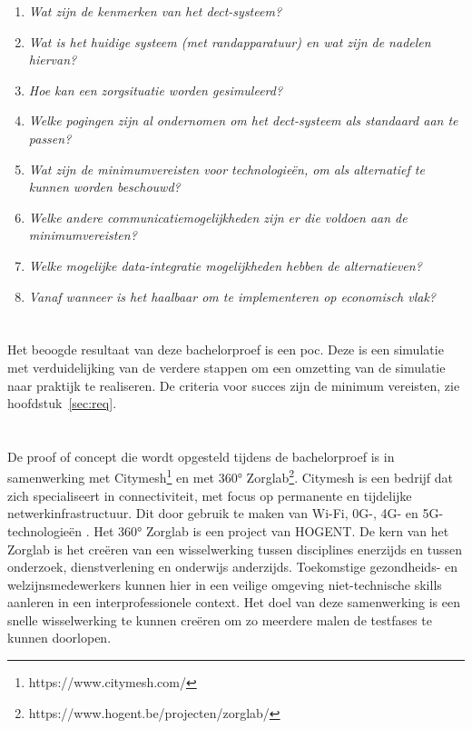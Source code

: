 \begin{enumerate}
  \item \textit{Wat zijn de kenmerken van het \gls{dect}-systeem?}
  \item \textit{Wat is het huidige systeem (met randapparatuur) en wat zijn de nadelen hiervan?}
  \item \textit{Hoe kan een zorgsituatie worden gesimuleerd?}
  \item \textit{Welke pogingen zijn al ondernomen om het \gls{dect}-systeem als standaard aan te passen?}
  \item \textit{Wat zijn de minimumvereisten voor technologieën, om als alternatief te kunnen worden beschouwd?}
  \item \textit{Welke andere communicatiemogelijkheden zijn er die voldoen aan de minimumvereisten?}
  \item \textit{Welke mogelijke data-integratie mogelijkheden hebben de alternatieven?}
  \item \textit{Vanaf wanneer is het haalbaar om te implementeren op economisch vlak?}
\end{enumerate}

\section{}%
\label{sec:onderzoeksdoelstelling}


Het beoogde resultaat van deze bachelorproef is een \gls{poc}. Deze is een simulatie met verduidelijking van de verdere stappen om een omzetting van de simulatie naar praktijk te realiseren. De criteria voor succes zijn de minimum vereisten, zie hoofdstuk~\ref{sec:req}.

\section{}%
\label{sec:opzet-bachelorproef}

De proof of concept die wordt opgesteld tijdens de bachelorproef is in samenwerking met Citymesh\footnote{https://www.citymesh.com/} en met 360° Zorglab\footnote{https://www.hogent.be/projecten/zorglab/}. Citymesh is een bedrijf dat zich specialiseert in connectiviteit, met focus op permanente en tijdelijke netwerkinfrastructuur. Dit door gebruik te maken van Wi-Fi, 0G-, 4G- en 5G-technologieën \autocite{Citymesh2024}. Het 360° Zorglab is een project van HOGENT. De kern van het Zorglab is het creëren van een wisselwerking tussen disciplines enerzijds en tussen onderzoek, dienstverlening en onderwijs anderzijds. Toekomstige gezondheids- en welzijnsmedewerkers kunnen hier in een veilige omgeving niet-technische skills aanleren in een interprofessionele context. \autocite{HOGENT2024} Het doel van deze samenwerking is een snelle wisselwerking te kunnen creëren om zo meerdere malen de testfases te kunnen doorlopen. 

